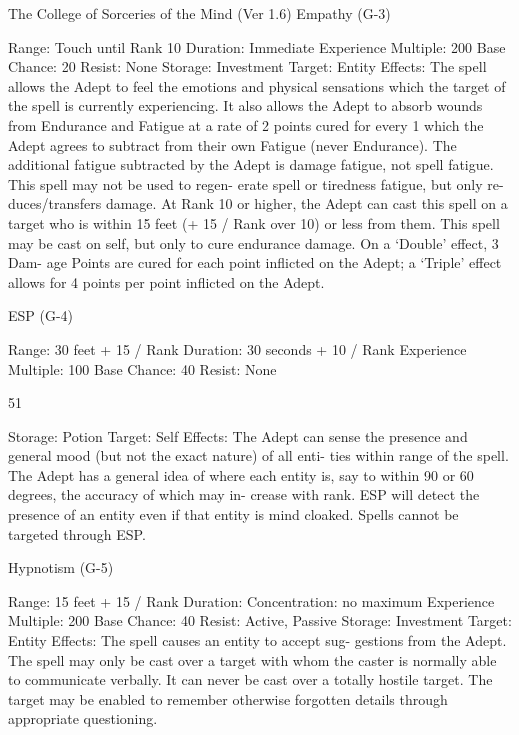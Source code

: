 \begin{Chapter}{The College of Sorceries of the Mind (Ver 1.6)}
Empathy (G-3) 

Range: Touch until Rank 10 
Duration: Immediate 
Experience Multiple: 200 
Base Chance: 20%
Resist: None 
Storage: Investment 
Target: Entity 
Effects:  The  spell  allows  the  Adept  to  feel  the 
emotions  and  physical  sensations  which  the  target 
of the spell is currently experiencing. It also allows 
the  Adept  to  absorb  wounds  from  Endurance  and 
Fatigue  at  a  rate  of  2  points  cured  for  every  1 
which the Adept agrees to subtract from their own 
Fatigue  (never  Endurance).  The  additional  fatigue 
subtracted  by  the  Adept  is  damage  fatigue,  not 
spell fatigue. This spell may not be used to regen-
erate  spell  or  tiredness  fatigue,  but  only  re-
duces/transfers damage. At Rank 10 or higher, the 
Adept can cast this spell on a target who is within 
15  feet  (+  15  /  Rank  over  10)  or  less  from  them. 
This  spell  may  be  cast  on  self,  but  only  to  cure 
endurance  damage.  On  a  ‘Double’  effect,  3  Dam-
age Points are cured for each point inflicted on the 
Adept;  a  ‘Triple’  effect  allows  for  4  points  per 
point inflicted on the Adept. 

ESP (G-4) 

Range: 30 feet + 15 / Rank 
Duration: 30 seconds + 10 / Rank 
Experience Multiple: 100 
Base Chance: 40%
Resist: None 

51 

Storage: Potion 
Target: Self 
Effects:  The  Adept  can  sense  the  presence  and 
general mood (but not the exact nature) of all enti-
ties  within  range  of  the  spell.  The  Adept  has  a 
general  idea  of  where  each  entity  is, say  to  within 
90  or  60  degrees,  the  accuracy  of  which  may  in-
crease  with  rank.  ESP  will  detect  the  presence  of 
an entity even if that entity is mind cloaked. Spells 
cannot be targeted through ESP. 

Hypnotism (G-5) 

Range: 15 feet + 15 / Rank 
Duration: Concentration: no maximum 
Experience Multiple: 200 
Base Chance: 40%
Resist: Active, Passive 
Storage: Investment 
Target: Entity 
Effects:  The  spell  causes  an  entity  to  accept  sug-
gestions  from  the  Adept.  The  spell  may  only  be 
cast over a target with whom the caster is normally 
able to communicate verbally.  It can never be cast 
over  a  totally  hostile  target.  The  target  may  be 
enabled  to  remember  otherwise  forgotten  details 
through appropriate questioning. 


\end{Chapter}
